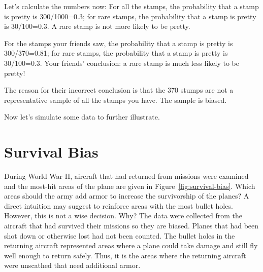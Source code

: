 Let's calculate the numbers now: For all the stamps, the probability that a stamp is pretty is 300/1000=0.3; for rare stamps, the probability that a stamp is pretty is 30/100=0.3. A rare stamp is not more likely to be pretty.

For the stamps your friends saw, the probability that a stamp is pretty is 300/370=0.81; for rare stamps, the probability that a stamp is pretty is 30/100=0.3. Your friends' conclusion: a rare stamp is much less likely to be pretty!

The reason for their incorrect conclusion is that the 370 stumps are not a representative sample of all the stamps you have. The sample is biased.

Now let's simulate some data to further illustrate.



\hypertarget{data}{%
\section{Survival Bias}\label{survival-bias}}
During World War II, aircraft that had returned from missions were examined and  the most-hit areas of the plane are given in Figure~\ref{fig:survival-bias}. Which areas should the army add armor to increase the survivorship of the planes? A direct intuition may suggest to reinforce areas with the most bullet holes. However, this is not a wise decision. Why? The data were collected from the aircraft that had survived their missions so they are biased. Planes that had been shot down or otherwise lost had not been counted. The bullet holes in the returning aircraft represented areas where a plane could take damage and still fly well enough to return safely. Thus, it is the areas where the returning aircraft were unscathed that need additional armor. 

